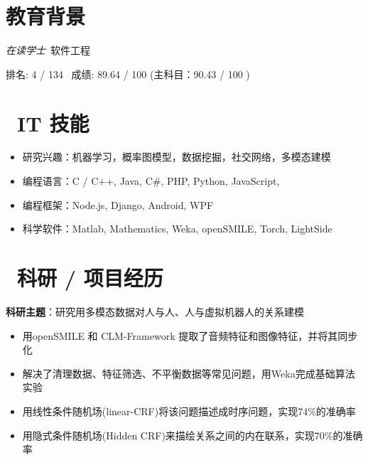 \documentclass{resume}
\begin{document}


 
\section{\faGraduationCap 教育背景}
\textit{在读学士}\ 软件工程

排名: 4 / 134 \ 成绩: 89.64 / 100 (主科目：90.43 / 100 )


\section{\faCogs\ IT 技能}
\begin{itemize}[parsep=0.5ex]
  \item 研究兴趣：机器学习，概率图模型，数据挖掘，社交网络，多模态建模
  \item 编程语言：C / C++, Java, C\#, PHP, Python, JavaScript,
  \item 编程框架：Node.js, Django, Android, WPF
  \item 科学软件：Matlab, Mathematics, Weka, openSMILE, Torch, LightSide
\end{itemize}


\section{\faUsers\ 科研 / 项目经历}
\textbf{科研主题}：研究用多模态数据对人与人、人与虚拟机器人的关系建模
\begin{itemize}
\item 用openSMILE 和 CLM-Framework 提取了音频特征和图像特征，并将其同步化
\item 解决了清理数据、特征筛选、不平衡数据等常见问题，用Weka完成基础算法实验
\item 用线性条件随机场(linear-CRF)将该问题描述成时序问题，实现74\%的准确率
\item 用隐式条件随机场(Hidden CRF)来描绘关系之间的内在联系，实现70\%的准确率
\end{itemize}
\end{document}
